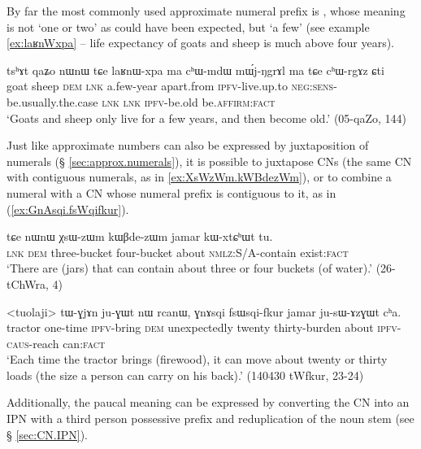 By far the most commonly used approximate numeral prefix is , whose meaning is not  `one or two' as could have been expected, but  `a few' (see example \ref{ex:laʁnWxpa} -- life expectancy of goats and sheep is much above four years).

\begin{exe}
\ex \label{ex:laʁnWxpa}
\gll tsʰɤt qaʑo nɯnɯ tɕe laʁnɯ-xpa ma cʰɯ-mdɯ mɯ́j-ŋgrɤl ma tɕe cʰɯ-rgɤz ɕti \\
goat sheep \textsc{dem} \textsc{lnk} a.few-year apart.from \textsc{ipfv}-live.up.to \textsc{neg}:\textsc{sens}-be.usually.the.case \textsc{lnk} \textsc{lnk} \textsc{ipfv}-be.old be.\textsc{affirm}:\textsc{fact} \\
\glt `Goats and sheep only live for a few years, and then become old.' (05-qaZo, 144)
\end{exe}

Just like approximate numbers can also be expressed by juxtaposition of numerals  (§ \ref{sec:approx.numerals}), it is possible to juxtapose CNs (the same CN with contiguous numerals, as in \ref{ex:XsWzWm.kWBdezWm}), or to combine a numeral with a CN whose numeral prefix is contiguous to it, as in (\ref{ex:GnAsqi.fsWqifkur}).

\begin{exe}
\ex \label{ex:XsWzWm.kWBdezWm}
\gll tɕe nɯnɯ χsɯ-zɯm kɯβde-zɯm jamar kɯ-xtɕʰɯt tu. \\
 \textsc{lnk} \textsc{dem} three-bucket four-bucket about \textsc{nmlz}:S/A-contain exist:\textsc{fact} \\
\glt `There are (jars) that can contain about three or four buckets (of water).' (26-tChWra, 4)
\end{exe}

\begin{exe}
\ex \label{ex:GnAsqi.fsWqifkur}
\gll <tuolaji> tɯ-ɣjɤn ju-ɣɯt nɯ rcanɯ, ɣnɤsqi fsɯsqi-fkur jamar ju-sɯ-ɤzɣɯt cʰa.  \\
 tractor one-time \textsc{ipfv}-bring \textsc{dem} unexpectedly twenty thirty-burden about \textsc{ipfv}-\textsc{caus}-reach can:\textsc{fact} \\
\glt `Each time the tractor brings (firewood), it can move about twenty or thirty loads (the size a person can carry on his back).' (140430 tWfkur, 23-24)
\end{exe}

Additionally, the paucal meaning can be expressed by converting the CN into an IPN with a third person possessive prefix and reduplication of the noun stem (see § \ref{sec:CN.IPN}).

